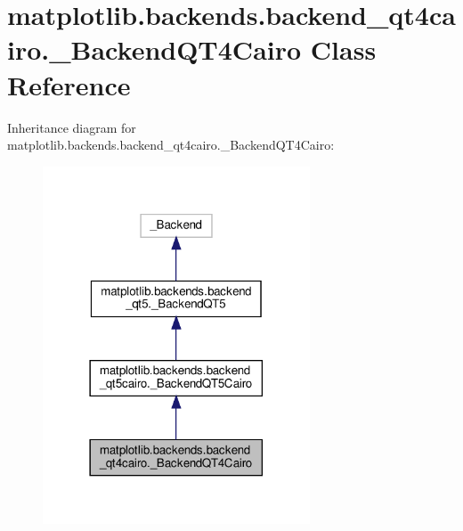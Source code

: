 \hypertarget{classmatplotlib_1_1backends_1_1backend__qt4cairo_1_1__BackendQT4Cairo}{}\section{matplotlib.\+backends.\+backend\+\_\+qt4cairo.\+\_\+\+Backend\+Q\+T4\+Cairo Class Reference}
\label{classmatplotlib_1_1backends_1_1backend__qt4cairo_1_1__BackendQT4Cairo}


Inheritance diagram for matplotlib.\+backends.\+backend\+\_\+qt4cairo.\+\_\+\+Backend\+Q\+T4\+Cairo\+:
\nopagebreak
\begin{figure}[H]
\begin{center}
\leavevmode
\includegraphics[width=225pt]{classmatplotlib_1_1backends_1_1backend__qt4cairo_1_1__BackendQT4Cairo__inherit__graph}
\end{center}
\end{figure}


